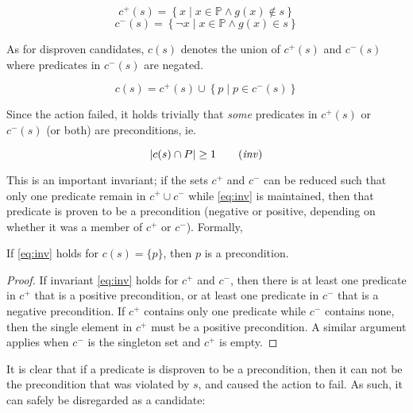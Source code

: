 \documentclass[../../Master.tex]{subfiles}
\begin{document}
\begin{equation} \label{eq:cPlus}
    c^+(s) = \left\{ x \; | \; x \in \mathbb{P} \land g(x) \notin s \right\}
\end{equation}
\begin{equation} \label{eq:cMinus}
    c^-(s) = \left\{ \neg x \; | \; x \in \mathbb{P} \land g(x) \in s \right\}
\end{equation}

As for disproven candidates, $c(s)$ denotes the union of $c^+(s)$ and $c^-(s)$ where predicates in $c^-(s)$ are negated.

\begin{equation}
    c(s) = c^+(s) \cup \left\{ p \; | \; p \in c^-(s) \right\}
\end{equation}

Since the action failed, it holds trivially that \textit{some} predicates in $c^+(s)$ or $c^-(s)$ (or both) are preconditions, ie.

\begin{equation} \label{eq:inv}
    \left| c(s) \cap P \right| \geq 1
    \tag{\emph{inv}}
\end{equation}

This is an important invariant; if the sets $c^+$ and $c^-$ can be reduced such that only one predicate remain in $c^+ \cup c^-$ while \eqref{eq:inv} is maintained, then that predicate is proven to be a precondition (negative or positive, depending on whether it was a member of $c^+$ or $c^-$). Formally,

\begin{proposition}
    If \eqref{eq:inv} holds for $c(s) = \{p\}$, then $p$ is a precondition.
\end{proposition}

\begin{proof}
    If invariant \eqref{eq:inv} holds for $c^+$ and $c^-$, then there is at least one predicate in $c^+$ that is a positive precondition, or at least one predicate in $c^-$ that is a negative precondition. If $c^+$ contains only one predicate while $c^-$ contains none, then the single element in $c^+$ must be a positive precondition. A similar argument applies when $c^-$ is the singleton set and $c^+$ is empty.
\end{proof}

It is clear that if a predicate is disproven to be a precondition, then it can not be the precondition that was violated by $s$, and caused the action to fail. As such, it can safely be disregarded as a candidate:
\end{document}
